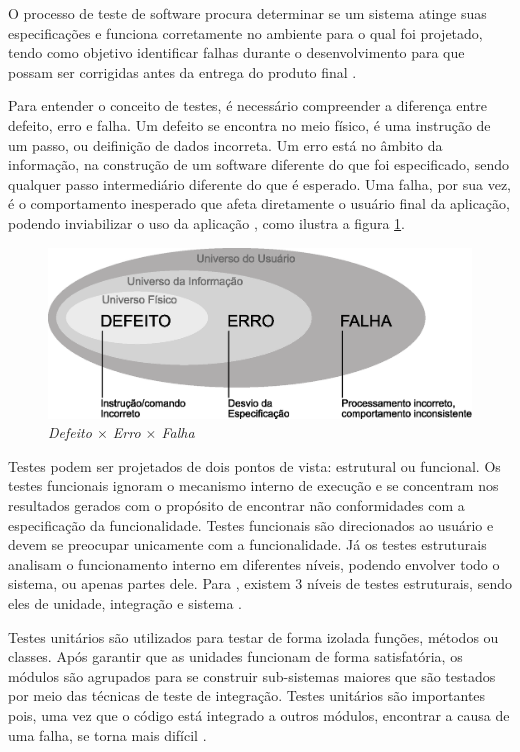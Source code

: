 O processo de teste de software procura determinar se um sistema atinge suas especificações e funciona corretamente no ambiente para o qual foi projetado, tendo como objetivo identificar falhas durante o desenvolvimento para que possam ser corrigidas antes da entrega do produto final  \cite{neto2005}. 

Para entender o conceito de testes, é necessário compreender a diferença entre defeito, erro e falha. Um defeito se encontra no meio físico, é uma instrução de um passo, ou deifinição de dados incorreta. Um erro está no âmbito da informação, na construção de um software diferente do que foi especificado, sendo qualquer passo intermediário diferente do que é esperado. Uma falha, por sua vez, é o comportamento inesperado que afeta diretamente o usuário final da aplicação, podendo inviabilizar o uso da aplicação \cite{ieee1990}, como ilustra a figura \ref{fig:erro}. 

\begin{figure}[h!]
	\centering
  	\includegraphics[width=.9\linewidth]{figuras/erro.eps}
  	\caption{\textit{Defeito \(\times\) Erro \(\times\) Falha}}
  	\label{fig:erro}
\end{figure}

Testes podem ser projetados de dois pontos de vista: estrutural ou funcional. Os testes funcionais ignoram o mecanismo interno de execução e se concentram nos resultados gerados com o propósito de encontrar não conformidades com a especificação da funcionalidade. Testes funcionais são direcionados ao usuário e devem se preocupar unicamente com a funcionalidade. Já os testes estruturais analisam o funcionamento interno em diferentes níveis, podendo envolver todo o sistema, ou apenas partes dele. Para \cite{naik2008}, existem 3 níveis de testes estruturais, sendo eles de unidade, integração e sistema \cite{naik2008}.

Testes unitários são utilizados para testar de forma izolada funções, métodos ou classes. Após garantir que as unidades funcionam de forma satisfatória, os módulos são agrupados para se construir sub-sistemas maiores que são testados por meio das técnicas de teste de integração. Testes unitários são importantes pois, uma vez que o código está integrado a outros módulos, encontrar a causa de uma falha, se torna mais difícil \cite{naik2008}.

